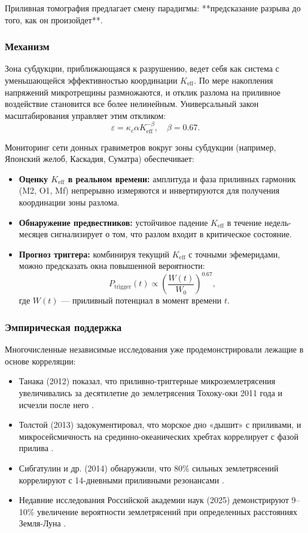 \documentclass[12pt,a4paper]{article}
\theoremstyle{remark}
\begin{document}
	Приливная томография предлагает смену парадигмы: **предсказание разрыва до того, как он произойдет**.
	
	\subsubsection{Механизм}
	
	Зона субдукции, приближающаяся к разрушению, ведет себя как система с уменьшающейся эффективностью координации \(K_{\mathrm{eff}}\). По мере накопления напряжений микротрещины размножаются, и отклик разлома на приливное воздействие становится все более нелинейным. Универсальный закон масштабирования управляет этим откликом:
	\[
	\varepsilon = \kappa_c \alpha K_{\mathrm{eff}}^{-\beta}, \quad \beta = 0.67.
	\]
	
	Мониторинг сети донных гравиметров вокруг зоны субдукции (например, Японский желоб, Каскадия, Суматра) обеспечивает:
	\begin{itemize}
		\item \textbf{Оценку \(K_{\mathrm{eff}}\) в реальном времени:} амплитуда и фаза приливных гармоник (M2, O1, Mf) непрерывно измеряются и инвертируются для получения координации зоны разлома.
		\item \textbf{Обнаружение предвестников:} устойчивое падение \(K_{\mathrm{eff}}\) в течение недель-месяцев сигнализирует о том, что разлом входит в критическое состояние.
		\item \textbf{Прогноз триггера:} комбинируя текущий \(K_{\mathrm{eff}}\) с точными эфемеридами, можно предсказать окна повышенной вероятности:
		\[
		P_{\text{trigger}}(t) \propto \left( \frac{W(t)}{W_0} \right)^{0.67},
		\]
		где \(W(t)\) — приливный потенциал в момент времени \(t\).
	\end{itemize}
	
	\subsubsection{Эмпирическая поддержка}
	
	Многочисленные независимые исследования уже продемонстрировали лежащие в основе корреляции:
	\begin{itemize}
		\item Танака (2012) показал, что приливно-триггерные микроземлетрясения увеличивались за десятилетие до землетрясения Тохоку-оки 2011 года и исчезли после него \cite{Tanaka2012}.
		\item Толстой (2013) задокументировал, что морское дно «дышит» с приливами, и микросейсмичность на срединно-океанических хребтах коррелирует с фазой прилива \cite{Tolstoy2013}.
		\item Сибгатулин и др. (2014) обнаружили, что 80\% сильных землетрясений коррелируют с 14-дневными приливными резонансами \cite{Sibgatulin2014}.
		\item Недавние исследования Российской академии наук (2025) демонстрируют 9–10\% увеличение вероятности землетрясений при определенных расстояниях Земля-Луна \cite{RAN2025}.
	\end{itemize}
	
\end{document}
